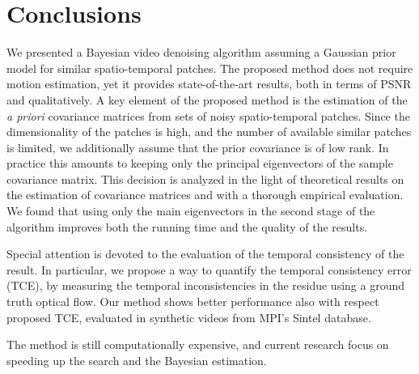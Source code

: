 \documentclass[10pt, journal, twocolumn, final, a4paper]{IEEEtran}
\begin{document}
\section{Conclusions}
\label{sec:conclusion}

We presented a Bayesian video denoising algorithm assuming a Gaussian prior
model for similar spatio-temporal patches. 
The proposed method does not require motion estimation, yet it provides 
state-of-the-art results, both in terms of PSNR and qualitatively. 
A key element of the proposed method is the estimation of the \textit{a priori}
covariance matrices from sets of noisy spatio-temporal patches. Since
the dimensionality of the patches is high, and the number of available 
similar patches is limited, we additionally assume that the prior covariance
is of low rank. In practice this amounts to keeping only the principal 
eigenvectors of the sample covariance matrix. This decision is analyzed
in the light of theoretical results on the estimation of covariance matrices 
and with a thorough empirical evaluation. We found that using only the 
main eigenvectors in the second stage of the algorithm improves both
the running time and the quality of the results.

Special attention is devoted to the evaluation of the temporal consistency of
the result. In particular, we propose a way to quantify the temporal
consistency error (TCE), by measuring the temporal inconsistencies in the
residue using a ground truth optical flow. Our method shows better performance
also with respect proposed TCE, evaluated in synthetic videos from MPI's Sintel
database.

The method is still computationally expensive, and current research focus
on speeding up the search and the Bayesian estimation.

%
%



\end{document}
